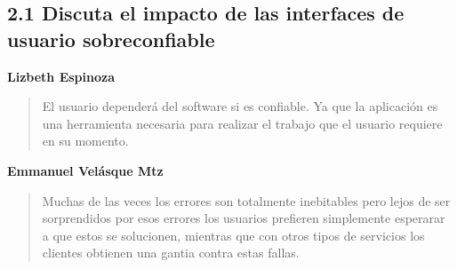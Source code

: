 \subsection*{2.1 Discuta el impacto de las interfaces de usuario sobreconfiable}

\textbf{Lizbeth Espinoza}

\begin{quote}
	El usuario dependerá del software si es confiable. Ya que la aplicación es una herramienta necesaria para realizar el trabajo que el usuario requiere en su momento.
\end{quote}

\textbf{Emmanuel Vel\'asque Mtz}

\begin{quote}
	Muchas de las veces los errores son totalmente inebitables pero lejos de ser sorprendidos por esos errores los usuarios prefieren simplemente esperarar a que estos se solucionen, mientras que con otros tipos de servicios los clientes obtienen una gantia contra estas fallas.
\end{quote}
